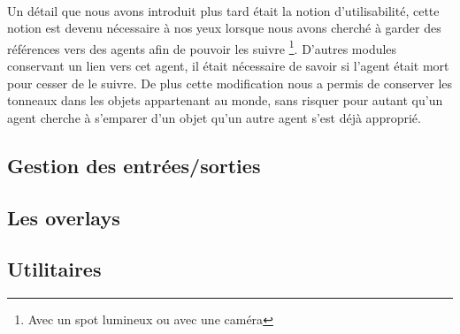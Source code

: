 \paragraph{}
Un détail que nous avons introduit plus tard était la notion d'utilisabilité,
cette notion est devenu nécessaire à nos yeux lorsque nous avons cherché à
garder des références vers des agents afin de pouvoir les suivre
\footnote{Avec un spot lumineux ou avec une caméra}. D'autres modules
conservant un lien vers cet agent, il était nécessaire de savoir si l'agent
était mort pour cesser de le suivre. De plus cette modification nous a permis
de conserver les tonneaux dans les objets appartenant au monde, sans risquer
pour autant qu'un agent cherche à s'emparer d'un objet qu'un autre agent s'est
déjà approprié.

\subsection{Gestion des entrées/sorties}

\subsection{Les overlays}

\subsection{Utilitaires}
